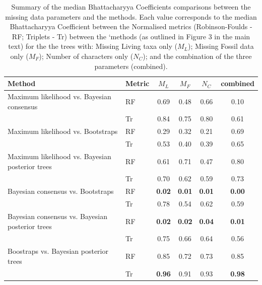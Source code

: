 \documentclass[12pt,letterpaper]{article}
\begin{document}
\begin{table}[ht]
\caption{Summary of the median Bhattacharyya Coefficients comparisons between the missing data parameters and the methods. Each value corresponds to the median Bhattacharyya Coefficient between the Normalised metrics (Robinson-Foulds - RF; Triplets - Tr) between the `methods (as outlined in Figure 3 in the main text) for the the trees with: Missing Living taxa only ($M_L$); Missing Fossil data only ($M_F$); Number of characters only ($N_C$); and the combination of the three parameters (combined).}
\begin{tabular}{llcccc}  
  \hline
 Method & Metric & $M_L$ & $M_F$ & $N_C$ & combined \\ 
  \hline
Maximum likelihood vs. Bayesian consensus & RF & 0.69 & 0.48 & 0.66 & 0.10 \\ 
   & Tr & 0.84 & 0.75 & 0.80 & 0.61 \\ 
Maximum likelihood vs. Bootstraps & RF & 0.29 & 0.32 & 0.21 & 0.69 \\ 
   & Tr & 0.53 & 0.40 & 0.39 & 0.65 \\ 
Maximum likelihood vs. Bayesian posterior trees & RF & 0.61 & 0.71 & 0.47 & 0.80 \\ 
  & Tr & 0.70 & 0.62 & 0.59 & 0.73 \\ 
Bayesian consensus vs. Bootstraps & RF & \textbf{0.02} & \textbf{0.01} & \textbf{0.01} & \textbf{0.00} \\ 
  & Tr & 0.78 & 0.54 & 0.62 & 0.59 \\ 
Bayesian consensus vs. Bayesian posterior trees & RF & \textbf{0.02} & \textbf{0.02} & \textbf{0.04} & \textbf{0.01} \\ 
   & Tr & 0.75 & 0.66 & 0.64 & 0.56 \\ 
Boostraps vs. Bayesian posterior trees & RF & 0.85 & 0.72 & 0.73 & 0.85 \\ 
   & Tr & \textbf{0.96} & 0.91 & 0.93 & \textbf{0.98} \\ 
 \hline
\end{tabular}
\end{table}
\end{document}
